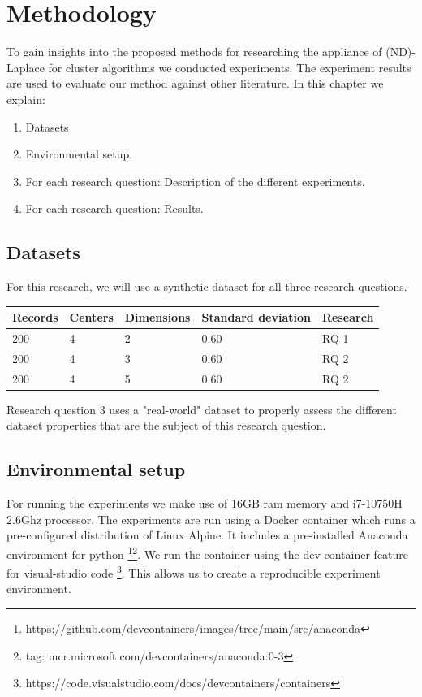 \chapter{Methodology}

To gain insights into the proposed methods for researching the appliance of (ND)-Laplace for cluster algorithms we conducted experiments.
The experiment results are used to evaluate our method against other literature.
In this chapter we explain:
\begin{enumerate}

  \item Datasets
  \item Environmental setup.
  \item For each research question: Description of the different experiments.
  \item For each research question: Results.
\end{enumerate}

\section{Datasets}
For this research, we will use a synthetic dataset for all three research questions.
\begin{table}[h]
  \begin{tabular}{@{}lllll@{}}
    \toprule
    Records & Centers & Dimensions & Standard deviation & Research \\ \midrule
    200     & 4       & 2          & 0.60               & RQ 1     \\ \bottomrule
    200     & 4       & 3          & 0.60               & RQ 2     \\ \bottomrule
    200     & 4       & 5          & 0.60               & RQ 2     \\ \bottomrule
  \end{tabular}
\end{table}

Research question 3 uses a "real-world" dataset to properly assess the different dataset properties that are the subject of this research question.
\section{Environmental setup}
For running the experiments we make use of 16GB ram memory and i7-10750H 2.6Ghz processor.
The experiments are run using a Docker container which runs a pre-configured distribution of Linux Alpine.
It includes a pre-installed Anaconda environment for python \footnote{https://github.com/devcontainers/images/tree/main/src/anaconda}\footnote{tag: mcr.microsoft.com/devcontainers/anaconda:0-3}.
We run the container using the dev-container feature for visual-studio code \footnote{https://code.visualstudio.com/docs/devcontainers/containers}.
This allows us to create a reproducible experiment environment.
\newpage
